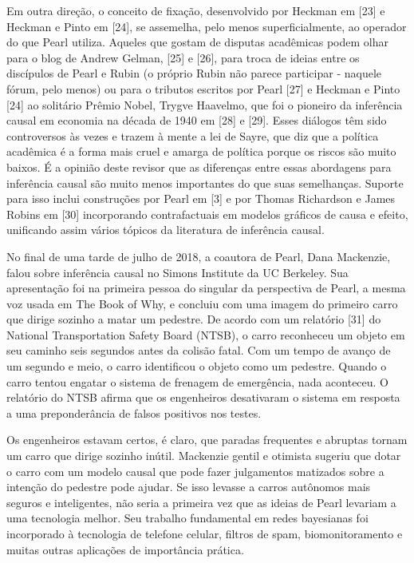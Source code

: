     Em outra direção, o conceito de fixação, desenvolvido por Heckman em [23] e Heckman e Pinto em [24], se assemelha, pelo menos superficialmente, ao operador do que Pearl utiliza. Aqueles que gostam de disputas acadêmicas podem olhar para o blog de Andrew Gelman, [25] e [26], para troca de ideias entre os discípulos de Pearl e Rubin (o próprio Rubin não parece participar - naquele fórum, pelo menos) ou para o tributos escritos por Pearl [27] e Heckman e Pinto [24] ao solitário Prêmio Nobel, Trygve Haavelmo, que foi o pioneiro da inferência causal em economia na década de 1940 em [28] e [29]. Esses diálogos têm sido controversos às vezes e trazem à mente a lei de Sayre, que diz que a política acadêmica é a forma mais cruel e amarga de política porque os riscos são muito baixos. É a opinião deste revisor que as diferenças entre essas abordagens para inferência causal são muito menos importantes do que suas semelhanças. Suporte para isso inclui construções por Pearl em [3] e por Thomas Richardson e James Robins em [30] incorporando contrafactuais em modelos gráficos de causa e efeito, unificando assim vários tópicos da literatura de inferência causal.

    
\noindent
\begin{minipage}[!ht]{\columnwidth}\centering
{}
\label{fig:04}
\end{minipage}



    No final de uma tarde de julho de 2018, a coautora de Pearl, Dana Mackenzie, falou sobre inferência causal no Simons Institute da UC Berkeley. Sua apresentação foi na primeira pessoa do singular da perspectiva de Pearl, a mesma voz usada em The Book of Why, e concluiu com uma imagem do primeiro carro que dirige sozinho a matar um pedestre. De acordo com um relatório [31] do National Transportation Safety Board (NTSB), o carro reconheceu um objeto em seu caminho seis segundos antes da colisão fatal. Com um tempo de avanço de um segundo e meio, o carro identificou o objeto como um pedestre. Quando o carro tentou engatar o sistema de frenagem de emergência, nada aconteceu. O relatório do NTSB afirma que os engenheiros desativaram o sistema em resposta a uma preponderância de falsos positivos nos testes.

    Os engenheiros estavam certos, é claro, que paradas frequentes e abruptas tornam um carro que dirige sozinho inútil. Mackenzie gentil e otimista sugeriu que dotar o carro com um modelo causal que pode fazer julgamentos matizados sobre a intenção do pedestre pode ajudar. Se isso levasse a carros autônomos mais seguros e inteligentes, não seria a primeira vez que as ideias de Pearl levariam a uma tecnologia melhor. Seu trabalho fundamental em redes bayesianas foi incorporado à tecnologia de telefone celular, filtros de spam, biomonitoramento e muitas outras aplicações de importância prática.


